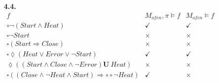 \documentclass[a4paper,11pt,fleqn]{scrartcl}
\begin{document}
\begin{enumerate}
        \item[\textbf{4.4.}]\quad \\
        \(
		\begin{array}{|l|c|c|}
		f & M_{ofen}, \pi \models f & M_{ofen}\models f \\ \hline
		\circ \neg (Start\land Heat) & \checkmark &\checkmark \\
		\square \neg Start &\times&\times \\
		\square (Start \Rightarrow Close)&\times&\times \\
		\square \lozenge (Heat \lor Error \lor \neg Start)&\checkmark&\checkmark \\
		\lozenge ((Start\land Close\land \neg Error)\textbf{U}\ Heat)&\times&\times \\
		\square ((Close\land \neg Heat\land Start)\Rightarrow \circ \circ \neg Heat)&\checkmark&\times \\		
		\end{array}
		\)
    \end{enumerate}
\end{document}
